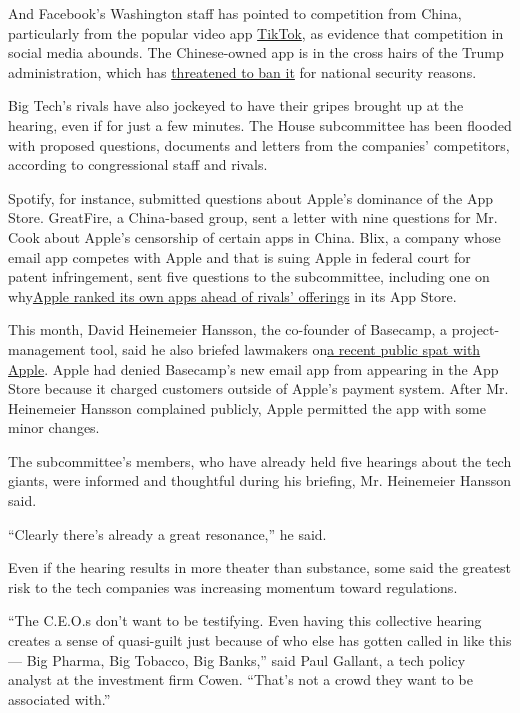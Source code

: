 And Facebook's Washington staff has pointed to competition from China,
particularly from the popular video app
\href{https://www.nytimes.com/2020/07/26/technology/tiktok-china-ban-model.html}{TikTok},
as evidence that competition in social media abounds. The Chinese-owned
app is in the cross hairs of the Trump administration, which has
\href{https://www.nytimes.com/2020/07/26/technology/tiktok-china-ban-model.html}{threatened
to ban it} for national security reasons.

Big Tech's rivals have also jockeyed to have their gripes brought up at
the hearing, even if for just a few minutes. The House subcommittee has
been flooded with proposed questions, documents and letters from the
companies' competitors, according to congressional staff and rivals.

Spotify, for instance, submitted questions about Apple's dominance of
the App Store. GreatFire, a China-based group, sent a letter with nine
questions for Mr. Cook about Apple's censorship of certain apps in
China. Blix, a company whose email app competes with Apple and that is
suing Apple in federal court for patent infringement, sent five
questions to the subcommittee, including one on
why\href{https://www.nytimes.com/interactive/2019/09/09/technology/apple-app-store-competition.html}{Apple
ranked its own apps ahead of rivals' offerings} in its App Store.

This month, David Heinemeier Hansson, the co-founder of Basecamp, a
project-management tool, said he also briefed lawmakers
on\href{https://www.nytimes.com/2020/06/19/opinion/apple-app-store-hey.html}{a
recent public spat with Apple}. Apple had denied Basecamp's new email
app from appearing in the App Store because it charged customers outside
of Apple's payment system. After Mr. Heinemeier Hansson complained
publicly, Apple permitted the app with some minor changes.

The subcommittee's members, who have already held five hearings about
the tech giants, were informed and thoughtful during his briefing, Mr.
Heinemeier Hansson said.

``Clearly there's already a great resonance,'' he said.

Even if the hearing results in more theater than substance, some said
the greatest risk to the tech companies was increasing momentum toward
regulations.

``The C.E.O.s don't want to be testifying. Even having this collective
hearing creates a sense of quasi-guilt just because of who else has
gotten called in like this --- Big Pharma, Big Tobacco, Big Banks,''
said Paul Gallant, a tech policy analyst at the investment firm Cowen.
``That's not a crowd they want to be associated with.''

